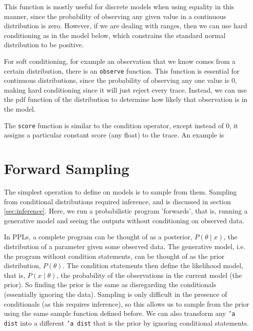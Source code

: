 		
This function is mostly useful for discrete models when using equality in this manner, since the probability of observing any given value in a continuous distribution is zero. However, if we are dealing with ranges, then we can use hard conditioning as in the model below, which constrains the standard normal distribution to be positive.
	

For soft conditioning, for example an observation that we know comes from a certain distribution, there is an \texttt{observe} function. This function is essential for continuous distributions, since the probability of observing any one value is 0, making hard conditioning since it will just reject every trace. Instead, we can use the pdf function of the distribution to determine how likely that observation is in the model.
	
The \texttt{score} function is similar to the condition operator, except instead of 0, it assigns a particular constant score (any float) to the trace. An example is %
		
\section{Forward Sampling}
The simplest operation to define on models is to sample from them. Sampling from conditional distributions required inference, and is discussed in section \ref{sec:inference}. Here, we run a probabilistic program 'forwards', that is, running a generative model and seeing the outputs without conditioning on observed data.
	
In PPLs, a complete program can be thought of as a posterior, $P(\theta\mid x)$, the distribution of a parameter given some observed data. The generative model, i.e. the program without condition statements, can be thought of as the prior distribution, $P(\theta)$. The condition statements then define the likelihood model, that is, $P(x\mid \theta)$, the probability of the observations in the current model (the prior). So finding the prior is the same as disregarding the conditionals (essentially ignoring the data). Sampling is only difficult in the presence of conditionals (as this requires inference), so this allows us to sample from the prior using the same sample function defined before. We can also transform any \texttt{'a dist} into a different \texttt{'a dist} that is the prior by ignoring conditional statements.
	
